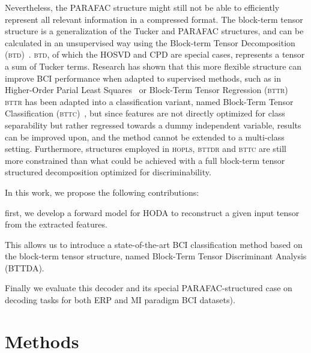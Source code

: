 \documentclass[twocolumn]{article}
\begin{document}
Nevertheless, the \textsc{PARAFAC} structure might still not be able to
efficiently represent all relevant information in a compressed format.
The block-term tensor structure is a generalization of the Tucker and
\textsc{PARAFAC} structures, and can be calculated in an unsupervised way using
the Block-term Tensor Decomposition
(\textsc{btd})~\cite{DeLathauwer2008,DeLathauwer2008a,DeLathauwer2008b,Rontogiannis2021}.
\textsc{btd}, of which the \textsc{HOSVD} and \textsc{CPD} are special cases,
represents a tensor a sum of Tucker terms.
Research has shown that this more flexible structure can improve BCI performance
when adapted to supervised methods, such as in Higher-Order Parial Least
Squares~\cite{Camarrone2018} or Block-Term Tensor Regression (\textsc{bttr})~\cite{Faes2022,Faes2022b}
\textsc{bttr} has been adapted into a classification variant, named Block-Term
Tensor Classification (\textsc{bttc})~\cite{Camarrone2021}, but since features
are not directly optimized for class separability but rather regressed towards
a dummy independent variable, results can be improved upon, and the method
cannot be extended to a multi-class setting.
Furthermore, structures employed in \textsc{hopls}, \textsc{bttdr} and
\textsc{bttc} are still more constrained than what could be achieved with a
full block-term tensor structured decomposition optimized for discriminability.


In this work, we propose the following contributions:
\begin{enumerate*}[label={\arabic*)}]
	\item first, we develop a forward model for \textsc{HODA} to reconstruct a
	      given input tensor from the extracted features.
	\item This allows us to introduce a state-of-the-art BCI classification method based on the
	      block-term tensor structure, named Block-Term Tensor Discriminant Analysis
	      (\textsc{BTTDA}).
	\item Finally we evaluate this decoder and its special
	      \textsc{PARAFAC}-structured case on decoding tasks for both ERP and MI
	      paradigm BCI datasets).
\end{enumerate*}

\section{Methods}
\end{document}
